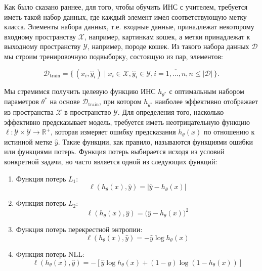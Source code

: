 Как было сказано раннее, для того, чтобы обучить ИНС с учителем, требуется иметь такой набор данных, где каждый элемент имел соответствующую метку класса. Элементы набора данных, т.е. входные данные, принадлежат некоторому входному пространству $\mathcal{X}$, например, картинкам кошек, а метки принадлежат к выходному пространству $\mathcal{Y}$, например, породе кошек. Из такого набора данных $\mathcal{D}$ мы строим тренировочную подвыборку, состоящую из пар, элементов:

\begin{equation}
    \mathcal{D}_{\text{train}} = \{\,(x_i, \hat y_i) \mid x_i \in \mathcal{X}, \hat y_i \in \mathcal{Y}, i=\overline{1, \dots, n}, n \le \lvert \mathcal{D} \rvert\,\}.
\end{equation}

Мы стремимся получить целевую функцию ИНС $h_{\theta^*}$ с оптимальным набором параметров $\theta^*$ на основе $\mathcal{D}_{\text{train}}$, при котором $h_{\theta^*}$ наиболее эффективно отображает из пространства $\mathcal{X}$ в пространство $\mathcal{Y}$. Для определения того, насколько эффективно предсказывает модель, требуется иметь неотрицательную функцию $\ell: \mathcal{Y} \times \mathcal{Y} \rightarrow \mathbb{R}^+$, которая измеряет ошибку предсказания $h_{\theta}(x)$ по отношению к истинной метке $\hat y$. Такие функции, как правило, называются функциями ошибки или функциями потерь. Функция потерь выбирается исходя из условий конкретной задачи, но часто является одной из следующих функций:
\begin{enumerate}
    \item Функция потерь $L_1$:
          \begin{equation}
              \ell\left(h_\theta(x), \hat y\right) = \lvert \hat y - h_\theta(x) \rvert
          \end{equation}
    \item Функция потерь $L_2$:
          \begin{equation}
              \ell\left(h_\theta(x), \hat y\right) = \big(\hat y - h_\theta(x)\big)^2
          \end{equation}
    \item Функция потерь перекрестной энтропии:
          \begin{equation}
              \ell\left(h_\theta(x), \hat y\right) = - \hat y\log{h_\theta(x)}
          \end{equation}
    \item Функция потерь NLL:
          \begin{equation}
              \ell\left(h_\theta(x), \hat y\right) = -\left[\hat y \log{h_\theta(x)} + (1 - \hat y)\log(1 - h_\theta(x))\right]
          \end{equation}
\end{enumerate}

